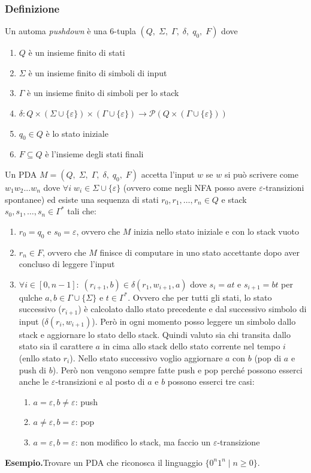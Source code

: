 \documentclass[italian]{article}
\newcommand{\powerset}[1]{\mathcal{P}(#1)}
\newcommand{\taleche}{\;|\;}
\newcommand{\example}{\noindent\textbf{Esempio.\quad}}
\begin{document}
\subsubsection{Definizione}
Un automa \textit{pushdown} è una $6$-tupla $(Q,\;\Sigma,\;\varGamma,\;\delta,\;q_0,\;F)$ dove
\begin{enumerate}
	\item $Q$ è un insieme finito di stati
	\item $\Sigma$ è un insieme finito di simboli di input
	\item $\varGamma$ è un insieme finito di simboli per lo stack
	\item $\delta: Q \times (\Sigma \cup \{\varepsilon\})\times(\varGamma \cup \{ \varepsilon\}) \to \powerset{Q \times (\varGamma \cup \{\varepsilon\})}$
	\item $q_0 \in Q$ è lo stato iniziale
	\item $F \subseteq Q$ è l'insieme degli stati finali
\end{enumerate}
Un PDA $M = (Q,\;\Sigma,\;\varGamma,\;\delta,\;q_0,\;F)$ accetta l'input $w$ se $w$ si può scrivere come $w_1w_2...w_n$ dove $\forall i \; w_i \in \Sigma \cup \{\varepsilon\}$ (ovvero come negli NFA posso avere $\varepsilon$-transizioni spontanee) ed esiste una sequenza di stati $r_0,r_1,\dots,r_n \in Q$ e stack $s_0,s_1,\dots,s_n \in \varGamma^*$ tali che:
\begin{enumerate}
	\item $r_0 = q_0$ e $s_0 = \varepsilon$, ovvero che $M$ inizia nello stato iniziale e con lo stack vuoto
	\item $r_n \in F$, ovvero che $M$ finisce di computare in uno stato accettante dopo aver concluso di leggere l'input
	\item $\forall i \in [0,n-1]:\;(r_{i+1},b) \in \delta(r_1,w_{i+1},a)$ dove $s_i = at$ e $s_{i+1} = bt$ per qulche $a,b \in \varGamma \cup \{\Sigma\}$ e $t \in \varGamma^*$. Ovvero che per tutti gli stati, lo stato successivo ($r_{i+1}$) è calcolato dallo stato precedente e dal successivo simbolo di input ($\delta(r_i,w_{i+1})$). Però in ogni momento posso leggere un simbolo dallo stack e aggiornare lo stato dello stack. Quindi valuto sia chi transita dallo stato sia il carattere $a$ in cima allo stack dello stato corrente nel tempo $i$ (enllo stato $r_i$). Nello stato successivo voglio aggiornare $a$ con $b$ (pop di $a$ e push di $b$). Però non vengono sempre fatte push e pop perché possono esserci anche le $\varepsilon$-transizioni e al posto di $a$ e $b$ possono esserci tre casi:
	\begin{enumerate}
		\item $a=\varepsilon,b \neq \varepsilon$: push
		\item $a\neq\varepsilon,b = \varepsilon$: pop
		\item $a=\varepsilon,b =\varepsilon$: non modifico lo stack, ma faccio un $\varepsilon$-transizione
	\end{enumerate}
\end{enumerate}
\pagebreak
\example Trovare un PDA che riconosca il linguaggio $\{ 0^n1^n \taleche n \geq 0 \}$. \\
\end{document}
